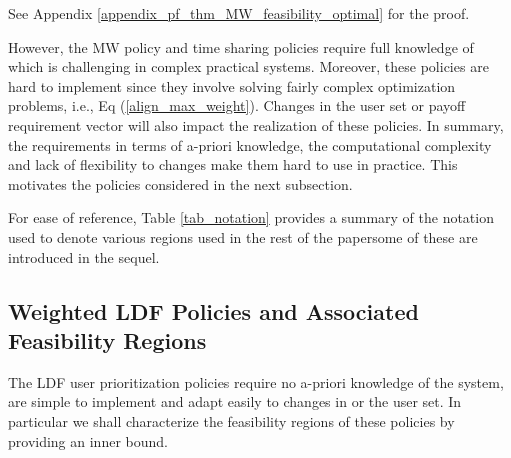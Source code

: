 \documentclass[prodmode,acmtompecs]{acmsmall}
\begin{document}
\noindent See Appendix \ref{appendix_pf_thm_MW_feasibility_optimal} for the proof.

However, the MW policy and time sharing policies require full knowledge of  which is challenging in complex practical systems. Moreover, these policies are hard to implement since they involve solving fairly complex optimization problems, i.e., Eq (\ref{align_max_weight}). Changes in the user set or payoff requirement vector  will also impact the realization of these policies. 
In summary, the requirements in terms of a-priori knowledge, the computational complexity and lack of flexibility to changes make them hard to use in practice. This motivates the policies considered in the next subsection. 

For ease of reference, Table \ref{tab_notation} provides a summary of the notation used to denote various regions used in the rest of the paper\textemdash some of these are introduced in the sequel. 

\begin{table}[h]
\normalsize
\end{table}

\subsection{Weighted LDF Policies and Associated Feasibility Regions}
\label{subsection_LDF}
The LDF user prioritization policies require no a-priori knowledge of the system, are simple to implement and adapt easily to changes in  or the user set. In particular we shall characterize the feasibility regions of these policies by providing an inner bound. 
\end{document}

